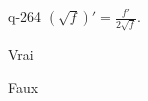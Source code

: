 \begin{truefalse}{q-264}
$(\sqrt f)' = \frac{f'}{2 \sqrt f}$.
\item* Vrai
\item Faux
\end{truefalse}

